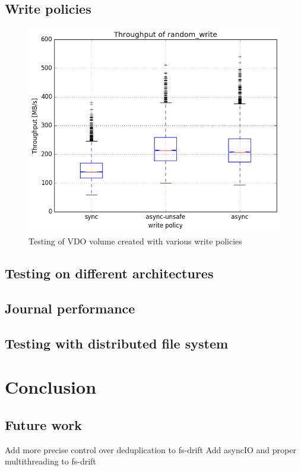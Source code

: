 \documentclass[
  color, %
  table, %
  lof,   %
  lot,   %
]{fithesis3}
\begin{document}
\section{Write policies}
\begin{figure}[!htb]
        \centering
        \includegraphics[width=\textwidth]{../results/write_policies/report/random_write1_compare_boxplots}
\caption[write policies]{Testing of VDO volume created with various write policies}
\label{fig:writepolicies}
\end{figure}



\section{Testing on different architectures}
\section{Journal performance}
\section{Testing with distributed file system}

\chapter{Conclusion}
\label{conclusion}

\section{Future work}
Add more precise control over deduplication to fs-drift
Add asyncIO and proper multithreading to fs-drift
\end{document}
